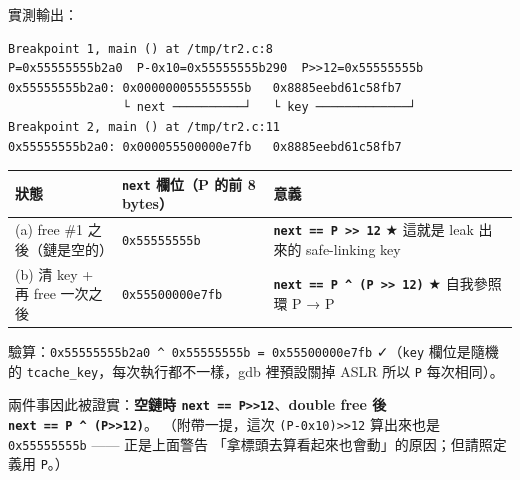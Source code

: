 \documentclass[10pt,a4paper]{article}
\newcounter{none}
\begin{document}
實測輸出：

\begin{Verbatim}[breaklines=true,breakanywhere=true,breakautoindent=false,fontsize=\fontsize{7.0}{9.5}\selectfont]
Breakpoint 1, main () at /tmp/tr2.c:8
P=0x55555555b2a0  P-0x10=0x55555555b290  P>>12=0x55555555b
0x55555555b2a0: 0x000000055555555b   0x8885eebd61c58fb7
                └ next ──────────┘   └ key ─────────────┘
Breakpoint 2, main () at /tmp/tr2.c:11
0x55555555b2a0: 0x000055500000e7fb   0x8885eebd61c58fb7
\end{Verbatim}

{\def\LTcaptype{none} %
\begin{longtable}[]{@{}
  >{\raggedright\arraybackslash}p{}
  >{\raggedright\arraybackslash}p{}
  >{\raggedright\arraybackslash}p{}@{}}
\toprule\noalign{}
\begin{minipage}[b]{\linewidth}\raggedright
狀態
\end{minipage} & \begin{minipage}[b]{\linewidth}\raggedright
\texttt{next} 欄位（P 的前 8 bytes）
\end{minipage} & \begin{minipage}[b]{\linewidth}\raggedright
意義
\end{minipage} \\
\midrule\noalign{}
\endhead
\bottomrule\noalign{}
\endlastfoot
(a) free \#1 之後（鏈是空的） & \texttt{0x55555555b} &
\textbf{\texttt{next\ \allowbreak{}==\ \allowbreak{}P\ \allowbreak{}\textgreater{}\allowbreak{}\textgreater{}\allowbreak{}\ \allowbreak{}12}} ★ 這就是
leak 出來的 safe-linking key \\
(b) 清 key + 再 free 一次之後 & \texttt{0x55500000e7fb} &
\textbf{\texttt{next\ \allowbreak{}==\ \allowbreak{}P\ \allowbreak{}\^\allowbreak{}{}\allowbreak{}\ \allowbreak{}(P\ \allowbreak{}\textgreater{}\allowbreak{}\textgreater{}\allowbreak{}\ \allowbreak{}12)}}
★ 自我參照環 P → P \\
\end{longtable}
}

驗算：\texttt{0x55555555b2a0\ \allowbreak{}\^\allowbreak{}{}\allowbreak{}\ \allowbreak{}0x55555555b\ \allowbreak{}=\ \allowbreak{}0x55500000e7fb}
✓（\texttt{key} 欄位是隨機的 \texttt{tcache\_\allowbreak{}key}，每次執行都不一樣，gdb
裡預設關掉 ASLR 所以 \texttt{P} 每次相同）。

兩件事因此被證實：\textbf{空鏈時
\texttt{next\ \allowbreak{}==\ \allowbreak{}P\textgreater{}\allowbreak{}\textgreater{}\allowbreak{}12}}、\textbf{double free
後 \texttt{next\ \allowbreak{}==\ \allowbreak{}P\ \allowbreak{}\^\allowbreak{}{}\allowbreak{}\ \allowbreak{}(P\textgreater{}\allowbreak{}\textgreater{}\allowbreak{}12)}}。
（附帶一提，這次 \texttt{(P-\allowbreak{}0x10)\textgreater{}\allowbreak{}\textgreater{}\allowbreak{}12}
算出來也是 \texttt{0x55555555b} ------ 正是上面警告
「拿標頭去算看起來也會動」的原因；但請照定義用 \texttt{P}。）
\end{document}
